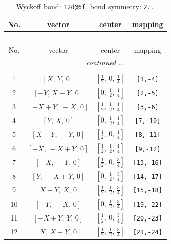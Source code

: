 \documentclass[fleqn,8pt]{jsarticle}
\begin{document}
\begin{longtable}{cccc}
\caption{Wyckoff bond: {\tt 12d@6f}, bond symmetry: {\tt 2..}}
 \\
 \hline \hline
No. & vector & center & mapping \\ \hline \endfirsthead

\multicolumn{3}{l}{\tablename\ \thetable{}} \\
 \hline \hline
No. & vector & center & mapping \\ \hline \endhead

 \hline \hline
\multicolumn{3}{r}{\footnotesize\it continued ...} \\ \endfoot

 \hline \hline
\multicolumn{3}{r}{} \\ \endlastfoot

1 & $\left[ X,\, Y,\, 0 \right]$ & $\left[ \frac{1}{2},\, 0,\, \frac{1}{4} \right]$ & {\tt [1,-4]} \\ \hline
2 & $\left[ - Y,\, X - Y,\, 0 \right]$ & $\left[ 0,\, \frac{1}{2},\, \frac{1}{4} \right]$ & {\tt [2,-5]} \\ \hline
3 & $\left[ - X + Y,\, - X,\, 0 \right]$ & $\left[ \frac{1}{2},\, \frac{1}{2},\, \frac{1}{4} \right]$ & {\tt [3,-6]} \\ \hline
4 & $\left[ Y,\, X,\, 0 \right]$ & $\left[ 0,\, \frac{1}{2},\, \frac{1}{4} \right]$ & {\tt [7,-10]} \\ \hline
5 & $\left[ X - Y,\, - Y,\, 0 \right]$ & $\left[ \frac{1}{2},\, 0,\, \frac{1}{4} \right]$ & {\tt [8,-11]} \\ \hline
6 & $\left[ - X,\, - X + Y,\, 0 \right]$ & $\left[ \frac{1}{2},\, \frac{1}{2},\, \frac{1}{4} \right]$ & {\tt [9,-12]} \\ \hline
7 & $\left[ - X,\, - Y,\, 0 \right]$ & $\left[ \frac{1}{2},\, 0,\, \frac{3}{4} \right]$ & {\tt [13,-16]} \\ \hline
8 & $\left[ Y,\, - X + Y,\, 0 \right]$ & $\left[ 0,\, \frac{1}{2},\, \frac{3}{4} \right]$ & {\tt [14,-17]} \\ \hline
9 & $\left[ X - Y,\, X,\, 0 \right]$ & $\left[ \frac{1}{2},\, \frac{1}{2},\, \frac{3}{4} \right]$ & {\tt [15,-18]} \\ \hline
10 & $\left[ - Y,\, - X,\, 0 \right]$ & $\left[ 0,\, \frac{1}{2},\, \frac{3}{4} \right]$ & {\tt [19,-22]} \\ \hline
11 & $\left[ - X + Y,\, Y,\, 0 \right]$ & $\left[ \frac{1}{2},\, 0,\, \frac{3}{4} \right]$ & {\tt [20,-23]} \\ \hline
12 & $\left[ X,\, X - Y,\, 0 \right]$ & $\left[ \frac{1}{2},\, \frac{1}{2},\, \frac{3}{4} \right]$ & {\tt [21,-24]} \\
\end{longtable}
\end{document}
